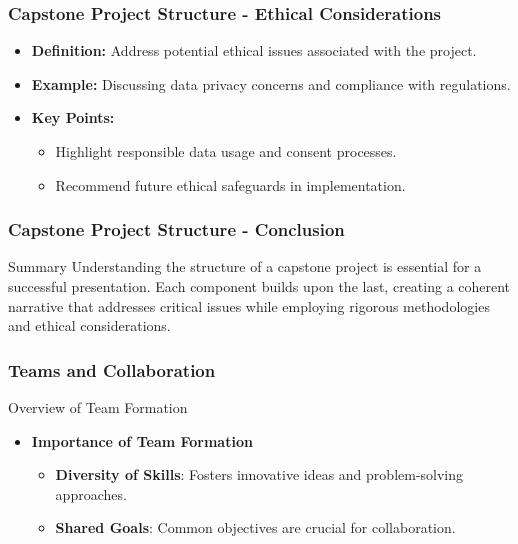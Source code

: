 \documentclass[aspectratio=169]{beamer}
\begin{document}
\begin{frame}[fragile]
  \frametitle{Capstone Project Structure - Ethical Considerations}
  \begin{itemize}
    \item \textbf{Definition:} Address potential ethical issues associated with the project.
    \item \textbf{Example:} Discussing data privacy concerns and compliance with regulations.
    \item \textbf{Key Points:}
      \begin{itemize}
        \item Highlight responsible data usage and consent processes.
        \item Recommend future ethical safeguards in implementation.
      \end{itemize}
  \end{itemize}
\end{frame}

\begin{frame}[fragile]
  \frametitle{Capstone Project Structure - Conclusion}
  \begin{block}{Summary}
    Understanding the structure of a capstone project is essential for a successful presentation.
    Each component builds upon the last, creating a coherent narrative that addresses critical issues while employing rigorous methodologies and ethical considerations.
  \end{block}
\end{frame}

\begin{frame}[fragile]
    \frametitle{Teams and Collaboration}
    \begin{block}{Overview of Team Formation}
        \begin{itemize}
            \item \textbf{Importance of Team Formation}
            \begin{itemize}
                \item \textbf{Diversity of Skills}: Fosters innovative ideas and problem-solving approaches.
                \item \textbf{Shared Goals}: Common objectives are crucial for collaboration.
            \end{itemize}
        \end{itemize}
    \end{block}
\end{frame}
\end{document}
